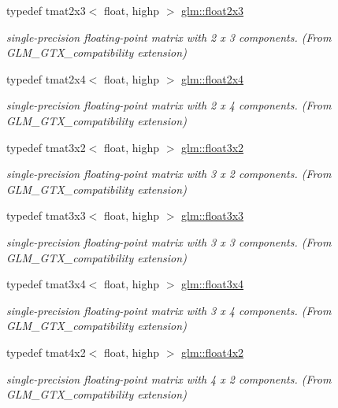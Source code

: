 \begin{DoxyCompactItemize}
typedef tmat2x3$<$ float, highp $>$ \hyperlink{group__gtx__compatibility_gad4078adf5ec44d1878c63bf2962fbe9e}{glm\+::float2x3}
\begin{DoxyCompactList}\small\item\em single-\/precision floating-\/point matrix with 2 x 3 components. (From G\+L\+M\+\_\+\+G\+T\+X\+\_\+compatibility extension) \end{DoxyCompactList}\item 
typedef tmat2x4$<$ float, highp $>$ \hyperlink{group__gtx__compatibility_ga33955674c7eee16728dd45fc10dc9547}{glm\+::float2x4}
\begin{DoxyCompactList}\small\item\em single-\/precision floating-\/point matrix with 2 x 4 components. (From G\+L\+M\+\_\+\+G\+T\+X\+\_\+compatibility extension) \end{DoxyCompactList}\item 
typedef tmat3x2$<$ float, highp $>$ \hyperlink{group__gtx__compatibility_ga2d2b535c9bad9274456ae12676bc6865}{glm\+::float3x2}
\begin{DoxyCompactList}\small\item\em single-\/precision floating-\/point matrix with 3 x 2 components. (From G\+L\+M\+\_\+\+G\+T\+X\+\_\+compatibility extension) \end{DoxyCompactList}\item 
typedef tmat3x3$<$ float, highp $>$ \hyperlink{group__gtx__compatibility_ga75c991509a4c4894f10ab480f89e39e7}{glm\+::float3x3}
\begin{DoxyCompactList}\small\item\em single-\/precision floating-\/point matrix with 3 x 3 components. (From G\+L\+M\+\_\+\+G\+T\+X\+\_\+compatibility extension) \end{DoxyCompactList}\item 
typedef tmat3x4$<$ float, highp $>$ \hyperlink{group__gtx__compatibility_gadbca4a528b4ef17b78afe91c00420087}{glm\+::float3x4}
\begin{DoxyCompactList}\small\item\em single-\/precision floating-\/point matrix with 3 x 4 components. (From G\+L\+M\+\_\+\+G\+T\+X\+\_\+compatibility extension) \end{DoxyCompactList}\item 
typedef tmat4x2$<$ float, highp $>$ \hyperlink{group__gtx__compatibility_ga4cb477bf8e9167ab065aa70c7767e329}{glm\+::float4x2}
\begin{DoxyCompactList}\small\item\em single-\/precision floating-\/point matrix with 4 x 2 components. (From G\+L\+M\+\_\+\+G\+T\+X\+\_\+compatibility extension) \end{DoxyCompactList}\item 

\end{DoxyCompactItemize}
